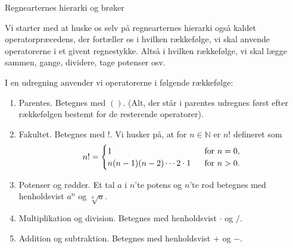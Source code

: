 \documentclass[12pt]{article}
\begin{document}


\begin{center}
\Huge
Regnearternes hierarki og brøker
\end{center}

Vi starter med at huske os selv på regnearternes hierarki også kaldet operatorpræcedens, der fortæller os i hvilken rækkefølge, vi skal anvende operatorerne i et givent regnestykke. Altså i hvilken rækkefølge, vi skal lægge sammen, gange, dividere, tage potenser osv. 
\begin{defn}
I en udregning anvender vi operatorerne i følgende rækkefølge:
\begin{enumerate}[label=\roman*)]
\item Parentes. Betegnes med $()$. (Alt, der står i parentes udregnes først efter rækkefølgen bestemt for de resterende operatorer).
\item Fakultet. Betegnes med $!$. Vi husker på, at for $n\in \mathbb{N}$ er $n!$ defineret som 
\begin{align*}
n! = \begin{cases}
1 \ &\textnormal{ for }n=0,\\
n(n-1)(n-2)\cdots 2\cdot 1 \ &\textnormal{ for }n>0.
\end{cases}
\end{align*}
\item Potenser og rødder. Et tal $a$ i $n$'te potens og $n$'te rod betegnes med henholdsvist $a^n$ og $\sqrt[n]{a}$.
\item Multiplikation og division. Betegnes med henholdsvist $\cdot$ og $/$.
\item Addition og subtraktion. Betegnes med henholdsvist $+$ og $-$.
\end{enumerate}
\end{defn} 
\end{document}
